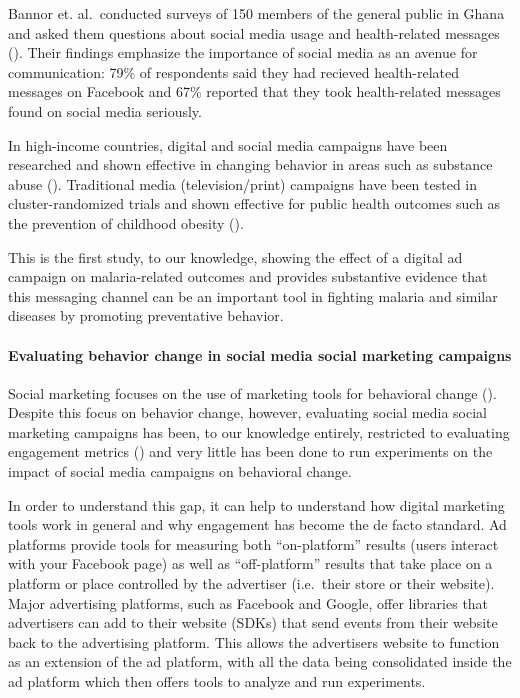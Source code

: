 \documentclass[a4paper,12pt]{article}
\begin{document}
Bannor et. al.\ conducted surveys of 150 members of the general public in Ghana and asked them questions about social media usage and health-related messages (\cite{Bannor2017}). Their findings emphasize the importance of social media as an avenue for communication: 79\% of respondents said they had recieved health-related messages on Facebook and 67\% reported that they took health-related messages found on social media seriously.

In high-income countries, digital and social media campaigns have been researched and shown effective in changing behavior in areas such as substance abuse (\cite{Evans2020}). Traditional media (television/print) campaigns have been tested in cluster-randomized trials and shown effective for public health outcomes such as the prevention of childhood obesity (\cite{Croker2012}).


This is the first study, to our knowledge, showing the effect of a digital ad campaign on malaria-related outcomes and provides substantive evidence that this messaging channel can be an important tool in fighting malaria and similar diseases by promoting preventative behavior.


\paragraph{Evaluating behavior change in social media social marketing campaigns}

Social marketing focuses on the use of marketing tools for behavioral change (\cite{Andreasen1994}). Despite this focus on behavior change, however, evaluating social media social marketing campaigns has been, to our knowledge entirely, restricted to evaluating engagement metrics (\cite{Shawky2019}) and very little has been done to run experiments on the impact of social media campaigns on behavioral change.

In order to understand this gap, it can help to understand how digital marketing tools work in general and why engagement has become the de facto standard. Ad platforms provide tools for measuring both ``on-platform'' results (users interact with your Facebook page) as well as ``off-platform'' results that take place on a platform or place controlled by the advertiser (i.e.\ their store or their website). Major advertising platforms, such as Facebook and Google, offer libraries that advertisers can add to their website (SDKs) that send events from their website back to the advertising platform. This allows the advertisers website to function as an extension of the ad platform, with all the data being consolidated inside the ad platform which then offers tools to analyze and run experiments.
\end{document}
